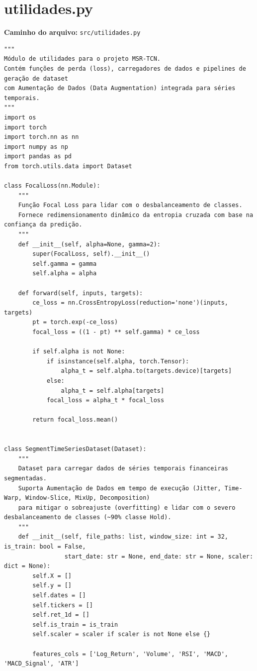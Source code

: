 \documentclass{article}
\begin{document}
\newpage

\section{utilidades.py}
\textbf{Caminho do arquivo:} \texttt{src/utilidades.py}

\begin{verbatim}
"""
Módulo de utilidades para o projeto MSR-TCN.
Contém funções de perda (loss), carregadores de dados e pipelines de geração de dataset
com Aumentação de Dados (Data Augmentation) integrada para séries temporais.
"""
import os
import torch
import torch.nn as nn
import numpy as np
import pandas as pd
from torch.utils.data import Dataset

class FocalLoss(nn.Module):
    """
    Função Focal Loss para lidar com o desbalanceamento de classes.
    Fornece redimensionamento dinâmico da entropia cruzada com base na confiança da predição.
    """
    def __init__(self, alpha=None, gamma=2):
        super(FocalLoss, self).__init__()
        self.gamma = gamma
        self.alpha = alpha
        
    def forward(self, inputs, targets):
        ce_loss = nn.CrossEntropyLoss(reduction='none')(inputs, targets)
        pt = torch.exp(-ce_loss)
        focal_loss = ((1 - pt) ** self.gamma) * ce_loss
        
        if self.alpha is not None:
            if isinstance(self.alpha, torch.Tensor):
                alpha_t = self.alpha.to(targets.device)[targets]
            else:
                alpha_t = self.alpha[targets]
            focal_loss = alpha_t * focal_loss
            
        return focal_loss.mean()


class SegmentTimeSeriesDataset(Dataset):
    """
    Dataset para carregar dados de séries temporais financeiras segmentadas.
    Suporta Aumentação de Dados em tempo de execução (Jitter, Time-Warp, Window-Slice, MixUp, Decomposition)
    para mitigar o sobreajuste (overfitting) e lidar com o severo desbalanceamento de classes (~90% classe Hold).
    """
    def __init__(self, file_paths: list, window_size: int = 32, is_train: bool = False, 
                 start_date: str = None, end_date: str = None, scaler: dict = None):
        self.X = []
        self.y = []
        self.dates = []
        self.tickers = []
        self.ret_1d = []
        self.is_train = is_train
        self.scaler = scaler if scaler is not None else {}
        
        features_cols = ['Log_Return', 'Volume', 'RSI', 'MACD', 'MACD_Signal', 'ATR']
        

\end{verbatim}
\end{document}
